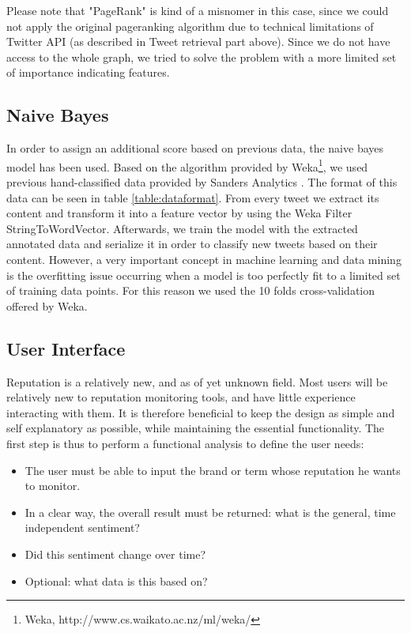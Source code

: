Please note that "PageRank" is kind of a misnomer in this case, since we could not apply the original pageranking algorithm due to technical limitations of Twitter API (as described in Tweet retrieval part above). Since we do not have access to the whole graph, we tried to solve the problem with a more limited set of importance indicating features.

\subsection{Naive Bayes}
In order to assign an additional score based on previous data, the naive bayes model has been used. Based on the algorithm provided by Weka\footnote{Weka, http://www.cs.waikato.ac.nz/ml/weka/}, we used previous hand-classified data provided by Sanders Analytics \cite{sandersanalytics} . The format of this data can be seen in table \ref{table:dataformat}. From every tweet we extract its content and transform it into a feature vector by using the Weka Filter StringToWordVector. Afterwards, we train the model with the extracted annotated data and serialize it in order to classify new tweets based on their content. However, a very important concept in machine learning and data mining is the overfitting issue occurring when a model is too perfectly fit to a limited set of training data points. For this reason we used the 10 folds cross-validation offered by Weka.

\subsection{User Interface}
Reputation is a relatively new, and as of yet unknown field. Most users will be relatively new to reputation monitoring tools, and have little experience interacting with them. It is therefore beneficial to keep the design as simple and self explanatory as possible, while maintaining the essential functionality. The first step is thus to perform a functional analysis to define the user needs:

\begin{itemize}
	\item The user must be able to input the brand or term whose reputation he wants to monitor.
	\item In a clear way, the overall result must be returned: what is the general, time independent sentiment?
	\item Did this sentiment change over time?
	\item Optional: what data is this based on?
\end{itemize}


